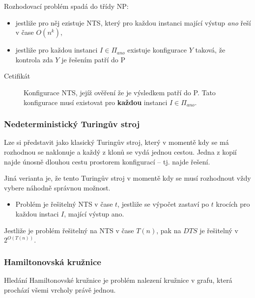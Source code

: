 Rozhodovací problém spadá do třídy NP:
\begin{itemize}
    \item jestliže pro něj ezistuje NTS, který pro každou instanci mající výstup \textit{ano} řeší v čase $O(n^k)$,
    \item jestliže pro každou instanci $I \in \Pi_{ano}$ existuje konfigurace $Y$ taková, že kontrola zda $Y$ je řešením patří do P
\end{itemize}

\begin{description}
    \item[Cetifikát] Konfigurace NTS, jejíž ověření že je výsledkem patří do P.
    Tato konfigurace musí existovat pro \textbf{každou} instanci $I \in \Pi_{ano}$.
\end{description}

\subsubsection*{Nedeterministický Turingův stroj}

Lze si představit jako klasický Turingův stroj, který v momentě kdy se má rozhodnou se naklonuje a každý z klonů se vydá jednou cestou.
Jedna z kopií najde únosně dlouhou cestu prostorem konfigurací -- tj. najde řešení.

Jiná verianta je, že tento Turingův stroj v momentě kdy se musí rozhodnout vždy vybere náhodně správnou možnost.

\begin{itemize}
    \item Problém je řešitelný NTS v čase $t$, jestliže se výpočet zastaví po $t$ krocích pro každou instaci $I$, mající výstup ano.
\end{itemize}

Jestliže je problém řešitelný na NTS v čase $T(n)$, pak na $DTS$ je řešitelný v $2^{O(T(n))}$.

\subsubsection*{Hamiltonovská kružnice}

Hledání Hamiltonovské kružnice je problém nalezení kružnice v grafu, která prochází všemi vrcholy právě jednou.

